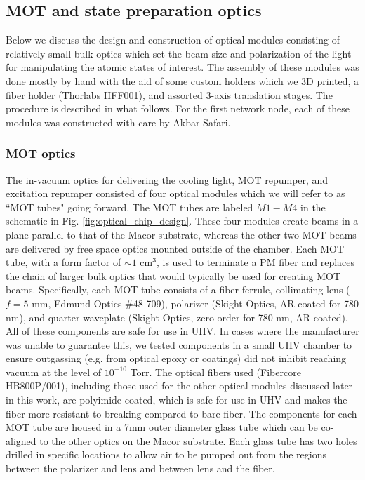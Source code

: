 \subsection{MOT and state preparation optics}
Below we discuss the design and construction of optical modules consisting of relatively small bulk optics which set the beam size and polarization of the light for manipulating the atomic states of interest. The assembly of these modules was done mostly by hand with the aid of some custom holders which we 3D printed, a fiber holder (Thorlabs HFF001), and assorted 3-axis translation stages. The procedure is described in what follows. For the first network node, each of these modules was constructed with care by Akbar Safari.

\subsubsection{MOT optics}

The in-vacuum optics for delivering the cooling light, MOT repumper, and excitation repumper consisted of four optical modules which we will refer to as ``MOT tubes" going forward. The MOT tubes are labeled $M1-M4$ in the schematic in Fig. \ref{fig:optical_chip_design}. These four modules create beams in a plane parallel to that of the Macor substrate, whereas the other two MOT beams are delivered by free space optics mounted outside of the chamber. Each MOT tube, with a form factor of $\sim1$ cm$^3$, is used to terminate a PM fiber and replaces the chain of larger bulk optics that would typically be used for creating MOT beams. Specifically, each MOT tube consists of a fiber ferrule, collimating lens ($f=5$ mm, Edmund Optics $\#$48-709), polarizer (Skight Optics, AR coated for 780 nm), and quarter waveplate (Skight Optics, zero-order for 780 nm, AR coated). All of these components are safe for use in UHV. In cases where the manufacturer was unable to guarantee this, we tested components in a small UHV chamber to ensure outgassing (e.g. from optical epoxy or coatings) did not inhibit reaching vacuum at the level of $10^{-10}$ Torr. The optical fibers used (Fibercore HB800P/001), including those used for the other optical modules discussed later in this work, are polyimide coated, which is safe for use in UHV and makes the fiber more resistant to breaking compared to bare fiber. The components for each MOT tube are housed in a 7mm outer diameter glass tube which can be co-aligned to the other optics on the Macor substrate. Each glass tube has two holes drilled in specific locations to allow air to be pumped out from the regions between the polarizer and lens and between lens and the fiber.

